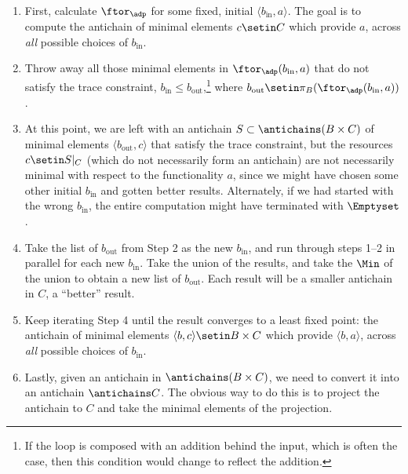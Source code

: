 \begin{enumerate}
    \item First, calculate $\ftor_\adp$ for some fixed, initial $\langle b_{\text{in}},a \rangle$.
          The goal is to compute the antichain of minimal elements $c \setin C$ which provide $a$, across \emph{all} possible choices of $b_{\text{in}}$.
    \item Throw away all those minimal elements in $\ftor_\adp(b_{\text{in}},a)$ that do not satisfy the trace constraint, $b_{\text{in}} \leq b_{\text{out}}$,\footnote{If the loop is composed with an addition behind the input, which is often the case, then this condition would change to reflect the addition.} where $b_{\text{out}} \setin \pi_B(\ftor_\adp(b_{\text{in}},a))$.
    \item At this point, we are left with an antichain $S \subset \antichains (B \times C)$ of minimal elements $\langle b_{\text{out}},c \rangle$ that satisfy the trace constraint, but the resources $c \setin S|_C$ (which do not necessarily form an antichain) are not necessarily minimal with respect to the functionality $a$, since we might have chosen some other initial $b_{\text{in}}$ and gotten better results.
          Alternately, if we had started with the wrong $b_{\text{in}}$, the entire computation might have terminated with $\Emptyset$.
    \item Take the list of $b_{\text{out}}$ from Step 2 as the new $b_{\text{in}}$, and run through steps 1--2 in parallel for each new $b_{\text{in}}$.
          Take the union of the results, and take the $\Min$ of the union to obtain a new list of $b_{\text{out}}$.
          Each result will be a smaller antichain in $C$, \ie  a ``better'' result.
    \item Keep iterating Step 4 until the result converges to a least fixed point: the antichain of minimal elements $\langle b, c \rangle \setin B \times C$ which provide $\langle b, a \rangle$, across \emph{all} possible choices of $b_{\text{in}}$.
    \item Lastly, given an antichain in $\antichains (B\times C)$, we need to convert it into an antichain $\antichains C$.
          The obvious way to do this is to project the antichain to $C$ and take the minimal elements of the projection.

\end{enumerate}
